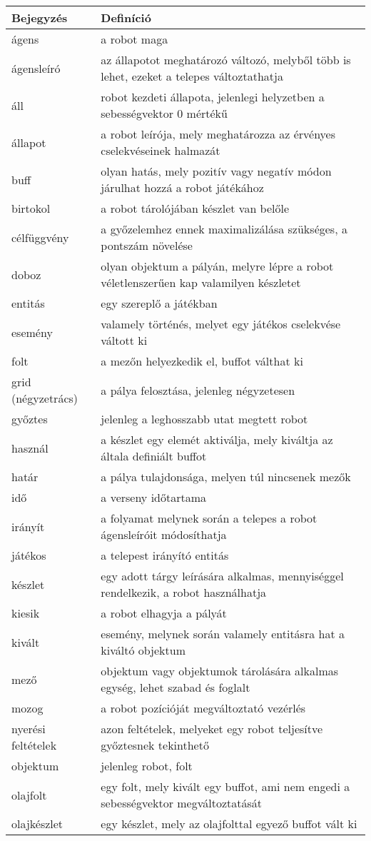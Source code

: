 \begin{tabularx}{\textwidth}{| l | l |}
\hline
\textbf{Bejegyzés} & \textbf{Definíció} \tabularnewline 
\hline\hline
\endhead
    ágens & a robot maga \tabularnewline \hline
    ágensleíró &  az állapotot meghatározó változó, melyből több is lehet, ezeket a telepes változtathatja \tabularnewline \hline
    áll &  robot kezdeti állapota, jelenlegi helyzetben a sebességvektor 0 mértékű \tabularnewline \hline
    állapot &  a robot leírója, mely meghatározza az érvényes cselekvéseinek halmazát \tabularnewline \hline
    buff &  olyan hatás, mely pozitív vagy negatív módon járulhat hozzá a robot játékához \tabularnewline \hline
    birtokol & a robot tárolójában készlet van belőle \tabularnewline \hline
    célfüggvény & a győzelemhez ennek maximalizálása szükséges, a pontszám növelése  \tabularnewline \hline
    doboz & olyan objektum a pályán, melyre lépre a robot véletlenszerűen kap valamilyen készletet\tabularnewline \hline
    entitás &  egy szereplő a játékban \tabularnewline \hline 
    esemény & valamely történés, melyet egy játékos cselekvése váltott ki \tabularnewline \hline
    folt &  a mezőn helyezkedik el, buffot válthat ki \tabularnewline \hline
    grid (négyzetrács) & a pálya felosztása, jelenleg négyzetesen \tabularnewline \hline
    győztes &  jelenleg a leghosszabb utat megtett robot \tabularnewline \hline
    használ &  a készlet egy elemét aktiválja, mely kiváltja az általa definiált buffot \tabularnewline \hline
    határ &  a pálya tulajdonsága, melyen túl nincsenek mezők \tabularnewline \hline
    idő &  a verseny időtartama \tabularnewline \hline
    irányít &  a folyamat melynek során a telepes a robot ágensleíróit módosíthatja \tabularnewline \hline
    játékos &  a telepest irányító entitás \tabularnewline \hline
    készlet &  egy adott tárgy leírására alkalmas, mennyiséggel rendelkezik, a robot használhatja \tabularnewline \hline
    kiesik &  a robot elhagyja a pályát \tabularnewline \hline
    kivált &  esemény, melynek során valamely entitásra hat a kiváltó objektum \tabularnewline \hline
    mező &  objektum vagy objektumok tárolására alkalmas egység, lehet szabad és foglalt \tabularnewline \hline
    mozog &  a robot pozícióját megváltoztató vezérlés \tabularnewline \hline
    nyerési feltételek &  azon feltételek, melyeket egy robot teljesítve győztesnek tekinthető \tabularnewline \hline
    objektum &  jelenleg robot, folt \tabularnewline \hline
    olajfolt &  egy folt, mely kivált egy buffot, ami nem engedi a sebességvektor megváltoztatását \tabularnewline \hline
    olajkészlet &  egy készlet, mely az olajfolttal egyező buffot vált ki \tabularnewline \hline

\end{tabularx}
